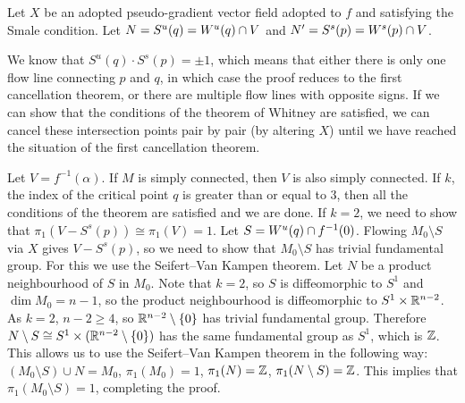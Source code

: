 \begin{myproof}
    Let $X$ be an adopted pseudo-gradient vector field adopted to  $f$ and satisfying the Smale condition.
    Let $N = S^{u}(q) = W^u(q) \cap V$ and $N' = S^{s}(p) = W^s(p) \cap  V$.

    We know that $S^{u}(q) \cdot S^{s}(p) = \pm 1$, which means that either there is only one flow line connecting $p$ and  $q$, in which case the proof reduces to the first cancellation theorem, or there are multiple flow lines with opposite signs.
    If we can show that the conditions of the theorem of Whitney are satisfied, we can cancel these intersection points pair by pair (by altering $X$) until we have reached the situation of the first cancellation theorem.

    Let $V = f^{-1}(\alpha)$.  If $M$ is simply connected, then $V$ is also simply connected.
    If $k$, the index of the critical point $q$ is greater than or equal to $3$, then all the conditions of the theorem are satisfied and we are done.
    If $k = 2$, we need to show that  $\pi_1(V - S^{s}(p)) \cong \pi_1(V) = 1$.
    Let $S = W^u(q) \cap f^{-1}(0)$.
    Flowing $M_0 \setminus S$ via $X$ gives  $V - S^{s}(p)$, so we need to show that $M_0 \setminus S$ has trivial fundamental group.
    For this we use the Seifert--Van Kampen theorem. Let $N$ be a product neighbourhood of $S$ in $M_0$.
    Note that $k=2$, so $S$ is diffeomorphic to $S^{1}$ and $\dim M_0 = n-1$, so the product neighbourhood is diffeomorphic to $ S^1 \times \mathbb{R}^{n-2}$.
    As $k=2$, $n - 2 \ge 4$, so $\mathbb{R}^{n-2} \setminus \{ 0 \} $ has trivial fundamental group. Therefore $N \setminus S \cong S^{1} \times (\mathbb{R}^{n-2}\setminus \{0\})$ has the same fundamental group as $S^{1}$, which is $\mathbb{Z}$.
    This allows us to use the Seifert--Van Kampen theorem in the following way:
    $(M_0 \setminus S) \cup N = M_0$, $\pi_1(M_0) = 1$,  $\pi_1(N) = \mathbb{Z}$,  $\pi_1(N \setminus S) = \mathbb{Z}$. This implies that $\pi_1(M_0 \setminus S) = 1$, completing the proof.
\end{myproof}

